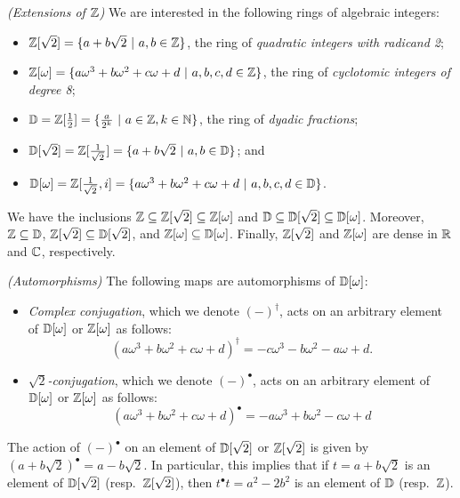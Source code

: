 \documentclass{article}
\begin{document}
\begin{definition}
\emph{(Extensions of $\mathbb{Z}$)}
We are interested in the following rings of algebraic integers: 
\begin{itemize}
  \item $\mathbb{Z}[\sqrt 2]=\{a+b\sqrt 2~|~ a,b\in\mathbb{Z}\}$, the ring of 
  \emph{quadratic integers with radicand 2}; 
  \item $\mathbb{Z}[\omega]=\{a\omega^3 +b\omega^2 +c\omega +d 
  ~|~ a,b,c,d \in \mathbb{Z}\}$, the ring of \emph{cyclotomic integers 
  of degree 8};  
  \item ${\mathbb{D}}=\mathbb{Z}[\frac{1}{2}]=\{\frac{a}{2^k}~|~ a\in \mathbb{Z}, k\in\mathbb{N}\}$,
  the ring of \emph{dyadic fractions};
  \item ${\mathbb{D}}[\sqrt 2]= \mathbb{Z}[\frac{1}{\sqrt{2}{}^{}}]=\{a+b\sqrt{2}~|~ a,b\in{\mathbb{D}}\}$; and 
  \item ${\mathbb{D}}[\omega]= \mathbb{Z}[\frac{1}{\sqrt{2}{}^{}}, i]=\{a\omega^3 +b\omega^2 +c\omega +d
  ~|~ a,b,c,d \in {\mathbb{D}}\}$.
\end{itemize}
\end{definition}

We have the inclusions $\mathbb{Z}\subseteq \mathbb{Z}[\sqrt 2]\subseteq \mathbb{Z}[\omega]$ 
and ${\mathbb{D}}\subseteq {\mathbb{D}}[\sqrt 2]\subseteq {\mathbb{D}}[\omega]$. Moreover, 
$\mathbb{Z}\subseteq{\mathbb{D}}$, $\mathbb{Z}[\sqrt 2]\subseteq {\mathbb{D}}[\sqrt 2]$, and 
$\mathbb{Z}[\omega]\subseteq {\mathbb{D}}[\omega]$. Finally, $\mathbb{Z}[\sqrt 2]$ and 
$\mathbb{Z}[\omega]$ are dense in ${\mathbb{R}}$ and ${\mathbb{C}}$, respectively. 

\begin{definition}
\emph{(Automorphisms)}
The following maps are automorphisms of ${\mathbb{D}}[\omega]$:
\begin{itemize} 
  \item \emph{Complex conjugation}, which we denote $(-)^\dagger$, 
  acts on an arbitrary element of ${\mathbb{D}}[\omega]$ or $\mathbb{Z}[\omega]$ as 
  follows:
  \[
  (a\omega^3 +b\omega^2 +c\omega +d)^\dagger = 
  -c\omega^3 -b\omega^2 -a\omega +d .
  \]
  \item  \emph{$\sqrt{2}$-conjugation}, which we denote 
  $(-)^\bullet$, acts on an arbitrary element of ${\mathbb{D}}[\omega]$ or $\mathbb{Z}[\omega]$
  as follows:
  \[
  (a\omega^3 +b\omega^2 +c\omega +d)^\bullet = 
  -a\omega^3 +b\omega^2 -c\omega +d
  \]
\end{itemize}
\end{definition}

The action of $(-)^\bullet$ on an element of ${\mathbb{D}}[\sqrt 2]$ or
$\mathbb{Z}[\sqrt 2]$ is given by $(a+b\sqrt{2})^\bullet = a-b\sqrt{2}$. In
particular, this implies that if $t=a+b\sqrt{2}$ is an element of ${\mathbb{D}}[\sqrt 2]$
(resp.\ $\mathbb{Z}[\sqrt 2]$), then $t^\bullet t=a^2-2b^2$ is an element of ${\mathbb{D}}$
(resp.\ $\mathbb{Z}$).
\end{document}
